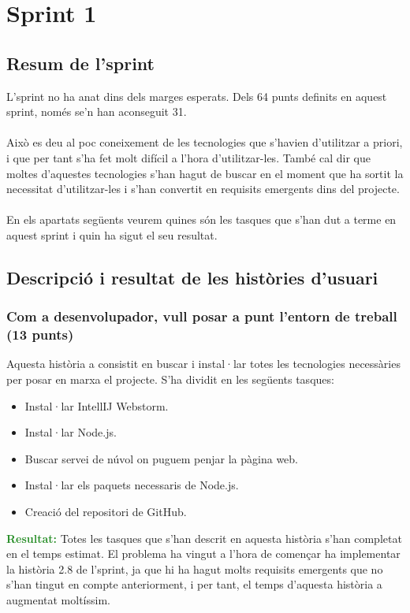 \documentclass[11pt,catalan,listoffigures,listoftables]{tfgetsinf}
\begin{document}
\section{Sprint 1}

\subsection{Resum de l'sprint}

L’sprint no ha anat dins dels marges esperats. Dels 64 punts definits en aquest sprint, només se’n han aconseguit 31.\\ \\
Això es deu al poc coneixement de les tecnologies que s’havien d’utilitzar a priori, i que per tant s’ha fet molt difícil a l’hora d’utilitzar-les. També cal dir que moltes d’aquestes tecnologies s’han hagut de buscar en el moment que ha sortit la necessitat d’utilitzar-les i s’han convertit en requisits emergents dins del projecte.\\ \\
En els apartats següents veurem quines són les tasques que s’han dut a terme en aquest sprint i quin ha sigut el seu resultat. 

\subsection{Descripció i resultat de les històries d’usuari}

\subsubsection{Com a desenvolupador, vull posar a punt l'entorn de treball (13 punts)}

Aquesta història a consistit en buscar i instal·lar totes les tecnologies necessàries per posar en marxa el projecte. S’ha dividit en les següents tasques:
\begin{itemize}
	\item Instal·lar IntellIJ Webstorm.
	\item Instal·lar Node.js.
	\item Buscar servei de núvol on puguem penjar la pàgina web.
	\item Instal·lar els paquets necessaris de Node.js.
	\item Creació del repositori de GitHub.
\end{itemize}
\textcolor{forestgreen}{\textbf{Resultat:}} Totes les tasques que s’han descrit en aquesta història s’han completat en el temps estimat. El problema ha vingut a l’hora de començar ha implementar la història 2.8 de l’sprint, ja que hi ha hagut molts requisits emergents que no s’han tingut en compte anteriorment, i per tant, el temps d’aquesta història a augmentat moltíssim.
\end{document}
